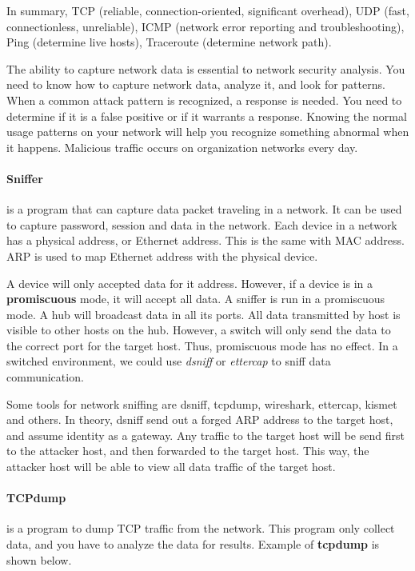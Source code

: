 \documentclass[7x9]{times}
\begin{document}
In summary, TCP (reliable, connection-oriented, significant
overhead), UDP (fast, connectionless, unreliable), ICMP (network error reporting and troubleshooting), Ping (determine live hosts), Traceroute (determine network path).

The ability to capture network data is essential to network
security analysis. You need to know how to capture network
data, analyze it, and look for patterns. When a common
attack pattern is recognized, a response is needed. You need
to determine if it is a false positive or if it warrants a
response. Knowing the normal usage patterns on your network
will help you recognize something abnormal when it happens.
Malicious traffic occurs on organization networks every day.

\paragraph{Sniffer} is a program that can capture data
packet traveling in a network. It can be used to capture
password, session and data in the network. Each device in a
network has a physical address, or Ethernet address. This is
the same with MAC address. ARP is used to map Ethernet
address with the physical device.

A device will only accepted data for it address. However, if
a device is in a \textbf{promiscuous} mode, it will accept
all data. A sniffer is run in a promiscuous mode. A hub will
broadcast data in all its ports. All data transmitted by
host is visible to other hosts on the hub. However, a switch
will only send the data to the correct port for the target
host. Thus, promiscuous mode has no effect. In a switched
environment, we could use \textit{dsniff} or
\textit{ettercap} to sniff data communication.

Some tools for network sniffing are dsniff, tcpdump,
wireshark, ettercap, kismet and others. In theory, dsniff
send out a forged ARP address to the target host, and assume
identity as a gateway. Any traffic to the target host will
be send first to the attacker host, and then forwarded to
the target host. This way, the attacker host will be able to
view all data traffic of the target host.

\paragraph{TCPdump} is a program to dump TCP traffic from
the network. This program only collect data, and you have to
analyze the data for results. Example of \textbf{tcpdump} 
is shown below.
\end{document}
